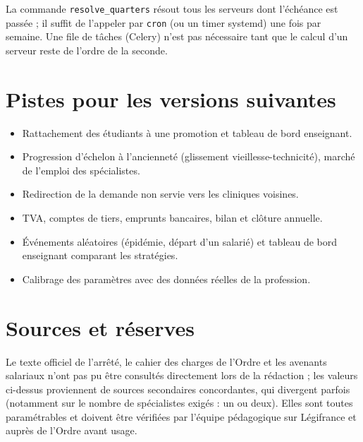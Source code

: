 \documentclass[11pt,a4paper]{article}
\newcommand{\code}[1]{\texttt{#1}}
\begin{document}
La commande \code{resolve\_quarters} résout tous les serveurs dont
l'échéance est passée ; il suffit de l'appeler par \code{cron} (ou un timer
systemd) une fois par semaine. Une file de tâches (Celery) n'est pas
nécessaire tant que le calcul d'un serveur reste de l'ordre de la seconde.

\section{Pistes pour les versions suivantes}

\begin{itemize}
  \item Rattachement des étudiants à une promotion et tableau de bord
    enseignant.
  \item Progression d'échelon à l'ancienneté (glissement
    vieillesse-technicité), marché de l'emploi des spécialistes.
  \item Redirection de la demande non servie vers les cliniques voisines.
  \item TVA, comptes de tiers, emprunts bancaires, bilan et clôture annuelle.
  \item Événements aléatoires (épidémie, départ d'un salarié) et tableau de
    bord enseignant comparant les stratégies.
  \item Calibrage des paramètres avec des données réelles de la profession.
\end{itemize}

\section{Sources et réserves}

Le texte officiel de l'arrêté, le cahier des charges de l'Ordre et les
avenants salariaux n'ont pas pu être consultés directement lors de la
rédaction ; les valeurs ci-dessus proviennent de sources secondaires
concordantes, qui divergent parfois (notamment sur le nombre de
spécialistes exigés : un ou deux). Elles sont toutes paramétrables et
doivent être vérifiées par l'équipe pédagogique sur Légifrance et auprès de
l'Ordre avant usage.
\end{document}
